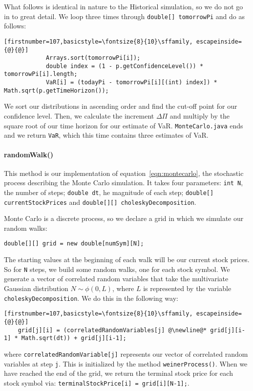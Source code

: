 \documentclass[../Dissertation.tex]{subfiles}
\begin{document}
What follows is identical in nature to the Historical simulation, so we do not go in to great detail.
We loop three times through \lstinline|double[] tomorrowPi| and do as follows:
\begin{lstlisting}[firstnumber=107,basicstyle=\fontsize{8}{10}\sffamily, escapeinside={@}{@}]
            Arrays.sort(tomorrowPi[i]);
            double index = (1 - p.getConfidenceLevel()) * tomorrowPi[i].length;
            VaR[i] = (todayPi - tomorrowPi[i][(int) index]) * Math.sqrt(p.getTimeHorizon());        
\end{lstlisting}
We sort our distributions in ascending order and find the cut-off point for our confidence level.
Then, we calculate the increment $\Delta\Pi$ and multiply by the square root of our time horizon for our estimate of VaR.
\lstinline|MonteCarlo.java| ends and we return \lstinline|VaR|, which this time contains three estimates of VaR.
\fi
\paragraph{randomWalk()}

This method is our implementation of equation~\ref{eqn:montecarlo}, the stochastic process describing the Monte Carlo simulation.
It takes four parameters: \lstinline|int N|, the number of steps; \lstinline|double dt|,  he magnitude of each step; \lstinline|double[] currentStockPrices| and \lstinline|double[][] choleskyDecomposition|.

Monte Carlo is a discrete process, so we declare a grid in which we simulate our random walks:
\begin{lstlisting}[firstnumber = 27]
	double[][] grid = new double[numSym][N];
\end{lstlisting}
The starting values at the beginning of each walk will be our current stock prices.
So for \lstinline|N| steps, we build some random walks, one for each stock symbol.
We generate a vector of correlated random variables that take the multivariate Gaussian distribution $N\sim\phi(0,L)$, where $L$ is represented by the variable \lstinline|choleskyDecomposition|.
We do this in the following way:
\begin{lstlisting}[firstnumber=107,basicstyle=\fontsize{8}{10}\sffamily, escapeinside={@}{@}]
	grid[j][i] = (correlatedRandomVariables[j] @\newline@* grid[j][i-1] * Math.sqrt(dt)) + grid[j][i-1];
\end{lstlisting}
where \lstinline|correlatedRandomVariable[j]| represents our vector of correlated random variables at step \lstinline|j|.
This is initialized by the method \lstinline|weinerProcess()|.
When we have reached the end of the grid, we return the terminal stock price for each stock symbol via: \lstinline|terminalStockPrice[i] = grid[i][N-1];|.
\end{document}
